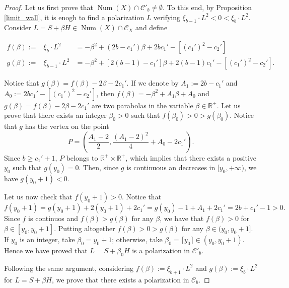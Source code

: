\documentclass[11pt,twoside]{amsart}
\theoremstyle{definition}
\newcommand{\Num}{\operatorname{Num}}
\begin{document}
\begin{proof}
    Let us first prove that $\Num(X)\cap \mathcal{C}'_b\neq\emptyset$. To this end, by Proposition \ref{limit_wall}, it is enogh to find a polarization $L$ verifying $\xi_{b-1}\cdot L^2<0<\xi_b\cdot L^2$.
    Consider $L=S+\beta H\in \Num(X)\cap\mathcal{C}_X$ %
    and define
   
    $\begin{array}{lll}
        f(\beta) :=&\xi_b\cdot L^2&=-\beta^2+(2b-c_1')\beta+2bc_1'-[(c_1')^2-c_2']  \\
        g(\beta):=& \xi_{b-1}\cdot L^2&=-\beta^2+[2(b-1)-c_1']\beta+2(b-1)c_1'-[(c_1')^2-c_2'] .
    \end{array}$

Notice that $g(\beta)=f(\beta)-2\beta-2c_1'$. If we denote by $A_1:=2b-c_1'$ and $A_0:=2bc_1'-[(c_1')^2-c_2']$, then $ f(\beta) =-\beta^2+A_1\beta+A_0$ and $g(\beta)=f(\beta)-2\beta-2c_1' $
    are two parabolas in the variable $\beta\in\mathbb{R}^+$.
Let us prove that there exists an integer $\beta_0>0$  such that $f(\beta_0)>0>g(\beta_0)$.
Notice that $g$ has the vertex on the point $$P=(\frac{A_1-2}{2},\frac{(A_1-2)^2}{4} +A_0-2c_1').$$ Since $b\geq c_1'+1$, $P$  belongs to $\mathbb{R}^+\times\mathbb{R}^+$, which implies that there exists a positive $y_0$ such that $g(y_0)=0$. 
Then, since $g$ is continuous an decreases in $[y_0,+\infty)$, we have $g(y_0+1)<0$.

Let us now check that $f(y_0+1)>0$.
Notice that $$f(y_0+1)=g(y_0+1)+2(y_0+1)+2c_1'=g(y_0)-1+A_1+2c_1'=2b+c_1'-1>0.$$
Since $f$ is continuos and $f(\beta)>g(\beta)$ for any $\beta$, we have that $f(\beta)>0$ for $\beta\in[y_0,y_0+1]$.
Putting altogether $f(\beta)>0>g(\beta)$ for any $\beta\in (y_0,y_0+1]$.
If $y_0$ is an integer, take $\beta_0=y_0+1$; otherwise, take $\beta_0=\lceil y_0\rceil\in(y_0,y_0+1) $.
Hence we have proved that $L=S+\beta_0H$ is a polarization in $\mathcal{C}'_b$.

Following the same argument, considering  $f(\beta):=\xi_{b+1}\cdot L^2$ and $g(\beta):=\xi_{b}\cdot L^2$ for $L=S+\beta H$, we prove that there exists a polarization in $\mathcal{C}_b$. 



    
\end{proof}
\end{document}

